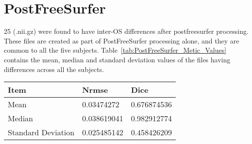 \section{PostFreeSurfer}\label{sec:Postfreesurfer}
25 (.nii.gz) were found to have inter-OS differences after postfreesurfer processing. These files are created as part of PostFreeSurfer processing alone, and they are common to all the five subjects. Table~\ref{tab:PostFreeSurfer_Metic_Values} contains the mean, median and standard deviation values of the files having differences across all the subjects.
\hfill \break
\begin{center}
\begin{tabular}{|l|l|l|}
\hline
\textbf{Item}      & \textbf{Nrmse} & \textbf{Dice} \\ \hline
Mean               & 0.03474272     & 0.676874536   \\ \hline
Median             & 0.038619041    & 0.982912774   \\ \hline
Standard Deviation & 0.025485142    & 0.458426209   \\ \hline
\end{tabular}
\label{tab:PostFreeSurfer_Metic_Values}
\end{center}
\hfill \break

